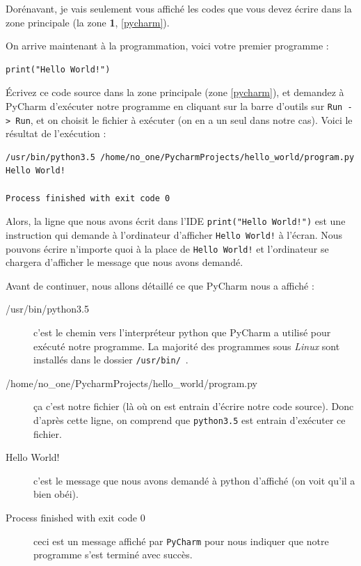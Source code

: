 \documentclass[12pt]{article}
\newcommand{\code}[1]{\colorbox{light-gray}{\texttt{#1}}}
\begin{document}
        Dorénavant, je vais seulement vous affiché les codes que vous devez écrire dans la zone principale (la zone
        \textbf{1}, \autoref{pycharm}).

        On arrive maintenant à la programmation, voici votre premier programme :
        \begin{lstlisting}[style=code]
print("Hello World!")
        \end{lstlisting}

        Écrivez ce code source dans la zone principale (zone  \autoref{pycharm}), et demandez à PyCharm
        d'exécuter notre programme en cliquant sur la barre d'outils sur \code{Run -> Run}, et on choisit le fichier
        à exécuter (on en a un seul dans notre cas). Voici le résultat de l'exécution :

        \begin{lstlisting}[style=exec_result]
/usr/bin/python3.5 /home/no_one/PycharmProjects/hello_world/program.py
Hello World!

Process finished with exit code 0
        \end{lstlisting}

        Alors, la ligne que nous avons écrit dans l'IDE \code{print("Hello World!")} est une instruction qui demande
        à l'ordinateur d'afficher \code{Hello World!} à l'écran. Nous pouvons écrire n'importe quoi à la place de
        \code{Hello World!} et l'ordinateur se chargera d'afficher le message que nous avons demandé.

        Avant de continuer, nous allons détaillé ce que PyCharm nous a affiché :
        \begin{description}
            \item[/usr/bin/python3.5] c'est le chemin vers l'interpréteur python que PyCharm a utilisé pour
                exécuté notre programme. La majorité des programmes sous \emph{Linux} sont installés dans le dossier
                \code{/usr/bin/}\ .
            \item[/home/no\_one/PycharmProjects/hello\_world/program.py] ça c'est notre fichier (là où on est entrain
                d'écrire notre code source). Donc d'après cette ligne, on comprend que \code{python3.5} est entrain
                d'exécuter ce fichier.
            \item[Hello World!] c'est le message que nous avons demandé à python d'affiché (on voit qu'il a bien
                obéi).
            \item[Process finished with exit code 0] ceci est un message affiché par \code{PyCharm} pour nous indiquer
                que notre programme s'est terminé avec succès.
        \end{description}
\end{document}

